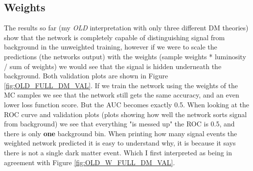 \documentclass[14pt, a4paper]{book}
\begin{document}
\subsection{Weights}\label{sec:wgts}
\graphicspath{{../../figures/}}
The results so far (my \textit{OLD} interpretation with only three different DM theories) show that the network is completely capable of distinguishing signal from background in the unweighted training, however if we were to scale the predictions (the networks output) with the weights (sample weights * luminosity / sum of weights) we would see that the signal is hidden underneath the background. Both validation plots are shown in Figure \ref{fig:OLD_FULL_DM_VAL}. If we train the network using the weights of the MC samples we see that the network still gets the same accuracy, and an even lower loss function score. But the AUC becomes exactly 0.5. When looking at the ROC curve and validation plots (plots showing how well the network sorts signal from background) we see that everything "is messed up" the ROC is 0.5, and there is only \textbf{one} background bin. When printing how many signal events the weighted network predicted it is easy to understand why, it is because it says there is not a single dark matter event. Which I first interpreted as being in agreement with Figure \ref{fig:OLD_W_FULL_DM_VAL}.\\
\end{document}

